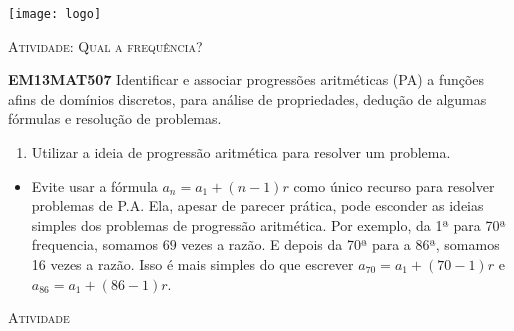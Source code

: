 \documentclass[10 pt,usenames,dvipsnames, oneside]{article}
\begin{document}
\begin{center}
  \begin{minipage}[l]{3cm}
\texttt{[image: logo]}    
\end{minipage}\hfill
\begin{minipage}[r]{.8\textwidth}
 {\Large \scshape Atividade: Qual a frequência?}  
\end{minipage}
\end{center}
\vspace{.2cm}

\ifdefined\prof
\begin{objetivos}
\item \textbf{EM13MAT507} Identificar e associar progressões aritméticas (PA) a funções afins de domínios discretos, para análise de propriedades, dedução de algumas fórmulas e resolução de problemas.
\end{objetivos}

\begin{goals}
\begin{enumerate}
\item Utilizar a ideia de progressão aritmética para resolver um problema.
\end{enumerate}

\tcblower
\begin{itemize}
\item Evite usar a fórmula $a_n=a_1+(n−1)r$ como único recurso para resolver problemas de P.A. Ela, apesar de parecer prática, pode esconder as ideias simples dos problemas de progressão aritmética. Por exemplo, da 1ª para 70ª frequencia, somamos $69$ vezes a razão. E depois da 70ª para a 86ª, somamos 16 vezes a razão. Isso é mais simples do que escrever $a_70=a_1+(70−1)r$ e $a_86=a_1+(86−1)r$.
\end{itemize}

\end{goals}

\bigskip
\begin{center}
{\large \scshape Atividade}
\end{center}
\fi
\end{document}
